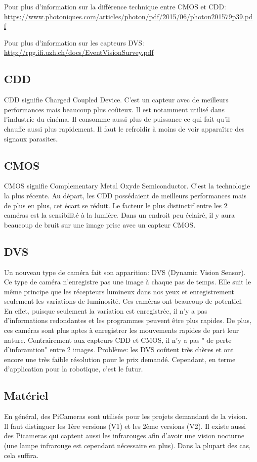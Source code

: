 \documentclass[a4paper, 11pt]{report}
\begin{document}
Pour plus d'information sur la différence technique entre CMOS et CDD: \url{https://www.photoniques.com/articles/photon/pdf/2015/06/photon201579p39.pdf}

Pour plus d'information sur les capteurs DVS: \url{http://rpg.ifi.uzh.ch/docs/EventVisionSurvey.pdf}

\subsection{CDD}

CDD signifie Charged Coupled Device. C'est un capteur avec de meilleurs performances mais beaucoup plus coûteux. Il est notamment utilisé dans l'industrie du cinéma. Il consomme aussi plus de puissance ce qui fait qu'il chauffe aussi plus rapidement. Il faut le refroidir à moins de voir apparaître des signaux parasites.


\subsection{CMOS}

CMOS signifie Complementary Metal Oxyde Semiconductor. C'est la technologie la plus récente. Au départ, les CDD possédaient de meilleurs performances mais de plus en plus, cet écart se réduit. Le facteur le plus distinctif entre les 2 caméras est la sensibilité à la lumière. Dans un endroit peu éclairé, il y aura beaucoup de bruit sur une image prise avec un capteur CMOS.

\subsection{DVS}
Un nouveau type de caméra fait son apparition: DVS (Dynamic Vision Sensor). Ce type de caméra n'enregistre pas une image à chaque pas de temps. Elle suit le même principe que les récepteurs lumineux dans nos yeux et enregistrement seulement les variations de luminosité. Ces caméras ont beaucoup de potentiel. En effet, puisque seulement la variation est enregistrée, il n'y a pas d'informations redondantes et les programmes peuvent être plus rapides. De plus, ces caméras sont plus aptes à enregistrer les mouvements rapides de part leur nature. Contrairement aux capteurs CDD et CMOS, il n'y a pas " de perte d'inforamtion" entre 2 images. Problème: les DVS coûtent très chères et ont encore une très faible résolution pour le prix demandé. Cependant, en terme d'application pour la robotique, c'est le futur.

\subsection{Matériel}
En général, des PiCameras sont utilisés pour les projets demandant de la vision. Il faut distinguer les 1ère versions (V1) et les 2ème versions (V2). Il existe aussi des Picameras qui captent aussi les infrarouges afin d'avoir une vision nocturne (une lampe infrarouge est cependant nécessaire en plus). Dans la plupart des cas, cela suffira.
\end{document}
